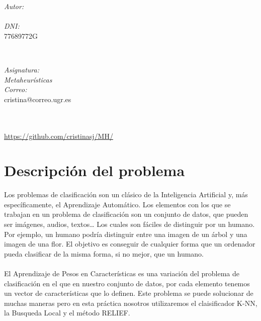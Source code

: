 \documentclass[12pt, spanish]{article}
\makeatletter
\let\theauthor\@author
\let\thedate\@date
\makeatother
\begin{document}
\begin{titlepage}
    \begin{minipage}{0.4\textwidth}
        \begin{flushleft} \large
            \emph{Autor:}\\
            \theauthor\\ 
			 \emph{DNI:}\\
            77689772G
            \end{flushleft}
            \end{minipage}~
            \begin{minipage}{0.4\textwidth}
            \begin{flushright} \large
            \emph{Asignatura: \\
            Metaheurísticas}   \\     
            \emph{Correo:}\\
            cristina@correo.ugr.es           
        \end{flushright}
    \end{minipage}\\[0.5cm]
  
    {\large \thedate}\\[0.5cm]
    {\url{https://github.com/cristinasj/MH/}}
 	
    \vfill
    
\end{titlepage}


\tableofcontents
\pagebreak



\section{Descripción del problema}
Los problemas de clasificación son un clásico de la Inteligencia Artificial y, más específicamente, el Aprendizaje Automático. Los elementos con los que se trabajan en un problema de clasificación son un conjunto de datos, que pueden ser imágenes, audios, textos… Los cuales son fáciles de distinguir por un humano. Por ejemplo, un humano podría distinguir entre una imagen de un árbol y una imagen de una flor. El objetivo es conseguir de cualquier forma que un ordenador pueda clasificar de la misma forma, si no mejor, que un humano.  \\ \\
El Aprendizaje de Pesos en Características es una variación del problema de clasificación en el que en nuestro conjunto de datos, por cada elemento tenemos un vector de características que lo definen. Este problema se puede solucionar de muchas maneras pero en esta práctica nosotros utilizaremos el claisificador K-NN, la Busqueda Local y el método RELIEF.  
\pagebreak
\end{document}
